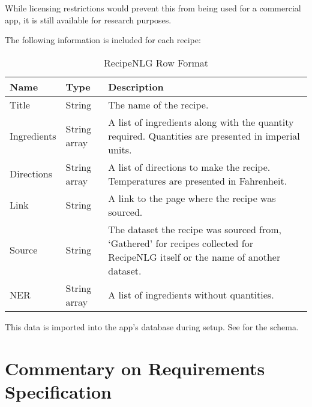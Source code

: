 While licensing restrictions would prevent this from being used for a commercial app, it is still available for
research purposes.

The following information is included for each recipe:

\begin{table}[h!]
    \caption{RecipeNLG Row Format}
    \label{tab:recipenlg_row_format}

    \begin{tabulary}{\textwidth}{|l|l|L|}
        \hline
        \textbf{Name} & \textbf{Type} & \textbf{Description} \\\hline

        Title & String & The name of the recipe. \\\hline

        Ingredients & String array & A list of ingredients along with the quantity required. Quantities are presented in imperial units. \\\hline

        Directions & String array & A list of directions to make the recipe. Temperatures are presented in Fahrenheit. \\\hline

        Link & String & A link to the page where the recipe was sourced. \\\hline

        Source & String & The dataset the recipe was sourced from, \enquote*{Gathered} for recipes collected for RecipeNLG itself or the name of another dataset. \\\hline

        NER & String array & A list of ingredients without quantities. \\\hline
    \end{tabulary}
\end{table}

This data is imported into the app's database during setup. See  for the schema.



\section{Commentary on Requirements Specification}


